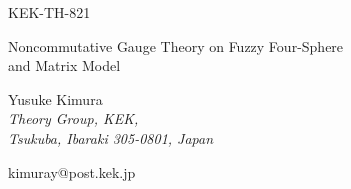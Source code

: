 \documentclass[a4paper,11pt]{article}
\begin{document}
\def\slash#1{{\rlap{$#1$} \thinspace/}}

\begin{flushright} 
KEK-TH-821 \\
\end{flushright} 

\vspace{0.1cm}

\begin{Large}
       \vspace{1cm}
  \begin{center}
   {Noncommutative Gauge Theory on Fuzzy Four-Sphere \\
   and Matrix Model  }      \\
  \end{center}
\end{Large}
\vspace{1cm}

\begin{center}
{\large  Yusuke Kimura }  \\ 


\vspace{0.5cm} 
{\it Theory Group, KEK, }\\
{\it Tsukuba, Ibaraki 305-0801, Japan} \\

\vspace{0.5cm} 

{kimuray@post.kek.jp}

\vspace{0.8cm} 


\end{center}


 \vspace{1cm}
\end{document}
